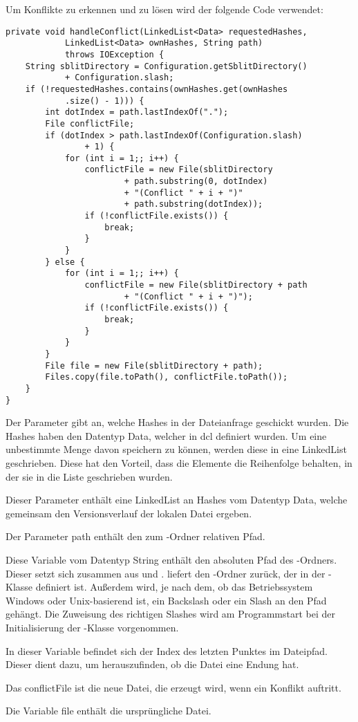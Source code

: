 Um Konflikte zu erkennen und zu lösen wird der folgende Code verwendet:
\javalisting
\begin{minipage}{\linewidth}
\begin{lstlisting}[caption={Erkennen eines Konflikts},captionpos=b]
private void handleConflict(LinkedList<Data> requestedHashes,
			LinkedList<Data> ownHashes, String path)
			throws IOException {
	String sblitDirectory = Configuration.getSblitDirectory()
			+ Configuration.slash;
	if (!requestedHashes.contains(ownHashes.get(ownHashes
			.size() - 1))) {
		int dotIndex = path.lastIndexOf(".");
		File conflictFile;
		if (dotIndex > path.lastIndexOf(Configuration.slash) 
				+ 1) {
			for (int i = 1;; i++) {
				conflictFile = new File(sblitDirectory
						+ path.substring(0, dotIndex)
						+ "(Conflict " + i + ")"
						+ path.substring(dotIndex));
				if (!conflictFile.exists()) {
					break;
				}
			}
		} else {
			for (int i = 1;; i++) {
				conflictFile = new File(sblitDirectory + path
						+ "(Conflict " + i + ")");
				if (!conflictFile.exists()) {
					break;
				}
			}
		}
		File file = new File(sblitDirectory + path);
		Files.copy(file.toPath(), conflictFile.toPath());
	}
}
\end{lstlisting}
\end{minipage}
\begin{description}
	 Der Parameter gibt an, welche Hashes in der Dateianfrage geschickt wurden. Die Hashes haben den Datentyp Data, welcher in \gls{dcl} definiert wurden. Um eine unbestimmte Menge davon speichern zu können, werden diese in eine LinkedList geschrieben. Diese hat den Vorteil, dass die Elemente die Reihenfolge behalten, in der sie in die Liste geschrieben wurden.
	
	 Dieser Parameter enthält eine LinkedList an Hashes vom Datentyp Data, welche gemeinsam den Versionsverlauf der lokalen Datei ergeben. 
	
	 Der Parameter path enthält den zum \sblit-Ordner relativen Pfad.
	
	 Diese Variable vom Datentyp String enthält den absoluten Pfad des \sblit-Ordners. Dieser setzt sich zusammen aus  und .  liefert den \sblit-Ordner zurück, der in der -Klasse definiert ist. Außerdem wird, je nach dem, ob das Betriebssystem Windows oder Unix-basierend ist, ein Backslash oder ein Slash an den Pfad gehängt. Die Zuweisung des richtigen Slashes wird am Programmstart bei der Initialisierung der -Klasse vorgenommen.

	 In dieser Variable befindet sich der Index des letzten Punktes im Dateipfad. Dieser dient dazu, um herauszufinden, ob die Datei eine Endung hat.
	
	 Das conflictFile ist die neue Datei, die erzeugt wird, wenn ein Konflikt auftritt.
	
	 Die Variable file enthält die ursprüngliche Datei.
\end{description}
